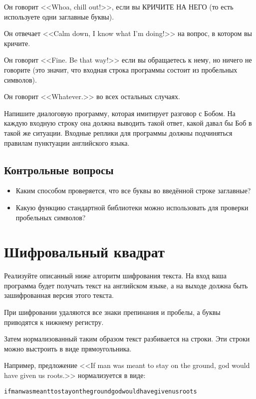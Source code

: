 \documentclass[10pt,twoside,openany]{book}
\begin{document}
Он говорит <<Whoa, chill out!>>, если вы КРИЧИТЕ НА НЕГО (то есть используете одни заглавные буквы).

Он отвечает <<Calm down, I know what I'm doing!>> на вопрос, в котором вы кричите.

Он говорит <<Fine. Be that way!>> если вы обращаетесь к нему, но ничего
не говорите (это значит, что входная строка программы состоит из пробельных символов).

Он говорит <<Whatever.>> во всех остальных случаях.

Напишите диалоговую программу, которая имитирует разговор с Бобом. На каждую входную строку она
должна выводить такой ответ, какой давал бы Боб в такой же ситуации. Входные реплики для программы
должны подчиняться правилам пунктуации английского языка.

\subsection*{Контрольные вопросы}

\begin{itemize}
    \item Каким способом проверяется, что все буквы во введённой строке заглавные?
    \item Какую функцию стандартной библиотеки можно использовать для проверки пробельных символов?
\end{itemize}

\section{Шифровальный квадрат}

Реализуйте описанный ниже алгоритм шифрования текста. На вход ваша программа
будет получать текст на английском языке, а на выходе должна быть зашифрованная
версия этого текста.

При шифровании удаляются все знаки препинания и пробелы, а буквы приводятся к нижнему регистру.

Затем нормализованный таким образом текст разбивается на строки.
Эти строки можно выстроить в виде прямоугольника.

Например, предложение <<If man was meant to stay on the ground, god would have given us roots.>>
нормализуется в виде:

\begin{verbatim}
ifmanwasmeanttostayonthegroundgodwouldhavegivenusroots
\end{verbatim}
\end{document}
